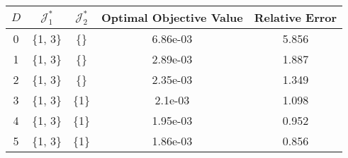 \begin{subtable}{\textwidth}
\centering
\begin{tabular}{|c|c|c|c|c|}
  \hline
$D$ & $\mathcal J_1^*$ & $\mathcal J_2^*$ & Optimal Objective Value & Relative Error \\ 
  \hline
0 & \{1, 3\} & \{\} & 6.86e-03 & 5.856 \\ 
  1 & \{1, 3\} & \{\} & 2.89e-03 & 1.887 \\ 
  2 & \{1, 3\} & \{\} & 2.35e-03 & 1.349 \\ 
  3 & \{1, 3\} & \{1\} & 2.1e-03 & 1.098 \\ 
  4 & \{1, 3\} & \{1\} & 1.95e-03 & 0.952 \\ 
  5 & \{1, 3\} & \{1\} & 1.86e-03 & 0.856 \\ 
   \hline
\end{tabular}
\end{subtable}
